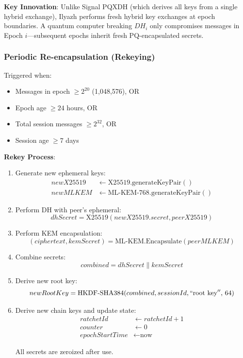 \documentclass[11pt,a4paper,oneside]{article}
\begin{document}
\vspace{0.3cm}
\textbf{Key Innovation}: Unlike Signal PQXDH (which derives all keys from a single hybrid exchange), Ilyazh performs fresh hybrid key exchanges at epoch boundaries. A quantum computer breaking $DH_i$ only compromises messages in Epoch $i$---subsequent epochs inherit fresh PQ-encapsulated secrets.

\subsubsection{Periodic Re-encapsulation (Rekeying)}

Triggered when:
\begin{itemize}
\item Messages in epoch $\geq 2^{20}$ (1,048,576), OR
\item Epoch age $\geq 24$ hours, OR
\item Total session messages $\geq 2^{32}$, OR
\item Session age $\geq 7$ days
\end{itemize}

\textbf{Rekey Process}:

\begin{enumerate}
\item Generate new ephemeral keys:
\begin{align*}
newX25519 &\leftarrow \text{X25519.generateKeyPair}() \\
newMLKEM &\leftarrow \text{ML-KEM-768.generateKeyPair}()
\end{align*}

\item Perform DH with peer's ephemeral:
\begin{equation}
dhSecret = \text{X25519}(newX25519.secret, peerX25519)
\end{equation}

\item Perform KEM encapsulation:
\begin{equation}
(ciphertext, kemSecret) = \text{ML-KEM.Encapsulate}(peerMLKEM)
\end{equation}

\item Combine secrets:
\begin{equation}
combined = dhSecret \| kemSecret
\end{equation}

\item Derive new root key:
\begin{equation}
newRootKey = \text{HKDF-SHA384}(combined, sessionId, ``\text{root key}''\text{, } 64)
\end{equation}

\item Derive new chain keys and update state:
\begin{align*}
ratchetId &\leftarrow ratchetId + 1 \\
counter &\leftarrow 0 \\
epochStartTime &\leftarrow \text{now}
\end{align*}

All secrets are zeroized after use.
\end{enumerate}
\end{document}
